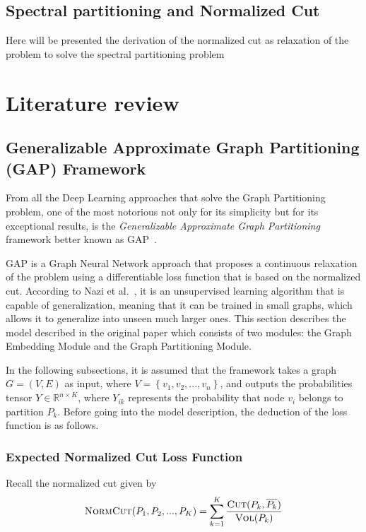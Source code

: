 
\subsection{Spectral partitioning and Normalized Cut}
Here will be presented the derivation of the normalized cut as relaxation of the problem to solve the spectral partitioning problem

\section{Literature review}

\subsection{Generalizable Approximate Graph Partitioning (GAP) Framework}
From all the Deep Learning approaches that solve the Graph Partitioning problem, one of the most notorious not only for its simplicity but for its exceptional results, is the \textit{Generalizable Approximate Graph Partitioning} framework better known as GAP~\cite{gap1}.

GAP is a Graph Neural Network approach that proposes a continuous relaxation of the problem using a differentiable loss function that is based on the normalized cut. According to Nazi et al.~\cite{gap}, it is an unsupervised learning algorithm that is capable of generalization, meaning that it can be trained in small graphs, which allows it to generalize into unseen much larger ones. This section describes the model described in the original paper which consists of two modules: the Graph Embedding Module and the Graph Partitioning Module.

In the following subsections, it is assumed that the framework takes a graph $G = (V, E)$ as input, where $V = \left\{ v_1, v_2, ..., v_n\right\}$, and outputs the probabilities tensor $Y\in \mathbb R^{n\times K}$, where $Y_{ik}$ represents the probability that node $v_i$ belongs to partition $P_k$. %
Before going into the model description, the deduction of the loss function is as follows.

\subsubsection{Expected Normalized Cut Loss Function}
Recall the normalized cut given by
\begin{equation}
    \label{eq:normalized_cut}
        \textsc{NormCut}(P_1, P_2, ..., P_K) = \sum_{k=1}^K \frac{\textsc{Cut}(P_k, \overline{P_k})}{\textsc{Vol}(P_k)}
\end{equation}
    
